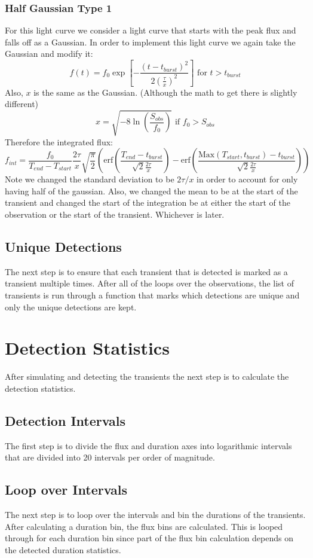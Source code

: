 \documentclass{article}
\begin{document}
\subsubsection{Half Gaussian Type 1}
For this light curve we consider a light curve that starts with the peak flux and falls off as a Gaussian. In order to implement this light curve we again take the Gaussian and modify it:
\[f(t) = f_0  \exp[-\frac{(t-t_{burst})^2}{2(\frac{\tau}{x})^2}]\text{ for }t>t_{burst}\]
Also, $x$ is the same as the Gaussian. (Although the math to get there is slightly different)
\[x=\sqrt{-8\ln(\frac{S_{obs}}{f_0})}\text{ if }f_0>S_{obs}\]
Therefore the integrated flux:
\[f_{int} = \frac{f_0}{T_{end}-T_{start}} \frac{2\tau}{x}\sqrt{\frac{\pi}{2}}(\text{erf}(\frac{T_{end}-t_{burst}}{\sqrt{2}\frac{2\tau}{x}})-\text{erf}(\frac{\text{Max}(T_{start},t_{burst})-t_{burst}}{\sqrt{2}\frac{2\tau}{x}}))\]
Note we changed the standard deviation to be $2\tau/x$ in order to account for only having half of the gaussian. Also, we changed the mean to be at the start of the transient and changed the start of the integration be at either the start of the observation or the start of the transient. Whichever is later.
\subsection{Unique Detections}
The next step is to ensure that each transient that is detected is marked as a transient multiple times. After all of the loops over the observations, the list of transients is run through a function that marks which detections are unique and only the unique detections are kept.

\section{Detection Statistics}
After simulating and detecting the transients the next step is to calculate the detection statistics. 

\subsection{Detection Intervals}
The first step is to divide the flux and duration axes into logarithmic intervals that are divided into 20 intervals per order of magnitude. 
\subsection{Loop over Intervals}
The next step is to loop over the intervals and bin the durations of the transients. After calculating a duration bin, the flux bins are calculated. This is looped through for each duration bin since part of the flux bin calculation depends on the detected duration statistics. 
\end{document}
